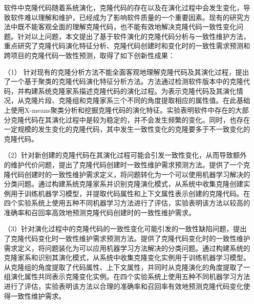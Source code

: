 



软件中克隆代码随着系统演化，克隆代码的存在以及在演化过程中会发生变化，导致软件难以理解和维护，已经成为了影响软件质量的一个重要因素。现有的研究方法中既不能客观全面的理解克隆代码，也不能有效地解决克隆代码一致性变化问题。针对以上问题，本文提出了基于软件演化的克隆代码分析与一致性维护方法，重点研究了克隆代码演化特征分析、克隆代码创建时和变化时的一致性需求预测和跨项目的克隆代码一致性预测，取得了如下创新性成果：

（1） 针对现有的克隆分析方法不能全面客观地理解克隆代码及其演化过程，提出了一个基于聚类的克隆代码演化特征分析方法。方法通过检测软件版本中的克隆代码，并构建系统克隆家系描述克隆代码的演化过程。为表示克隆代码及其演化情况，从克隆片段、克隆组和克隆家系三个不同的角度提取相应的属性值。在此基础上使用X-means聚类分析和挖掘克隆代码的演化特征。实验表明软件中存在的大部分克隆代码在其演化过程中是较为稳定的，并不会发生频繁的变化。同时，也存在一定规模的发生变化的克隆代码，其中发生一致性变化的克隆要多于不一致变化的克隆代码。

（2）针对新创建的克隆代码在其演化过程可能会引发一致性变化，从而导致额外的维护代价问题，提出了克隆代码创建时一致性维护需求预测方法。提供了一个克隆代码创建时的一致性维护需求定义，将问题转化为一个可以使用机器学习解决的分类问题。通过构建系统克隆家系并识别克隆演化模式，从系统中收集克隆创建实例用于训练机器学习模型，并提取代码属性和上下文属性表示创建的克隆代码。在四个实验系统上使用五种不同机器学习方法进行了评估，实验表明该方法以较高的准确率和召回率高效地预测克隆代码创建时的一致性维护需求。

（3）针对演化过程中的克隆代码的一致性变化可能引发的一致性缺陷问题，提出了克隆代码变化时一致性维护需求预测方法。提供了克隆代码变化时的一致性维护需求定义，将问题装化为可以应用机器学习方法解决的分类问题。通过构建系统的克隆家系和识别其演化模式，从系统中收集克隆变化实例用于训练机器学习模型。从克隆组的角度提取了代码属性、上下文属性，并同时从克隆演化的角度提取了一组演化属性共同表示克隆变化实例。在四个实验系统上使用五种不同机器学习方法进行了评估，实验表明该方法以合理的准确率和召回率有效地预测克隆代码变化使得一致性维护需求。

